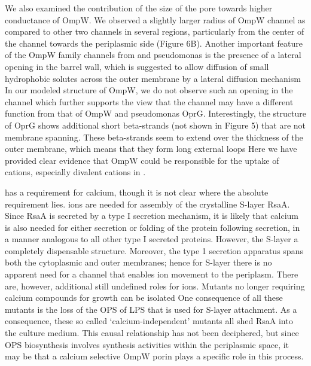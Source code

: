 We also examined the contribution of the size of the pore towards higher conductance of \caulobacter OmpW. We observed a slightly larger radius of \caulobacter OmpW channel as compared to other two channels in several regions, particularly from the center of the channel towards the periplasmic side (Figure 6B). Another important feature of the OmpW family channels from \ecoli and \ac{pseudomonas} is the presence of a lateral opening in the barrel wall, which is suggested to allow diffusion of small hydrophobic solutes across the outer membrane by a lateral diffusion mechanism In our modeled structure of \caulobacter OmpW, we do not observe such an opening in the channel which further supports the view that the \caulobacter channel may have a different function from that of \ecoli OmpW and \ac{pseudomonas} OprG. Interestingly, the structure of OprG shows additional short beta-strands (not shown in Figure 5) that are not membrane spanning. These beta-strands seem to extend over the thickness of the outer membrane, which means that they form long external loops Here we have provided clear evidence that OmpW could be responsible for the uptake of cations, especially divalent cations in \caulobacter. 

\caulobacter has a requirement for calcium, though it is not clear where the absolute requirement lies.  ions are needed for assembly of the crystalline \ac{S-layer} RsaA. Since RsaA is secreted by a type I secretion mechanism, it is likely that calcium is also needed for either secretion or folding of the protein following secretion, in a manner analogous to all other type I secreted proteins.  However, the \ac{S-layer} a completely dispensable structure. Moreover, the type 1 secretion apparatus spans both the cytoplasmic and outer membranes; hence for \ac{S-layer} there is no apparent need for a channel that enables  ion movement to the periplasm. There are, however, additional still undefined roles for  ions. Mutants no longer requiring calcium compounds for growth can be isolated One consequence of all these mutants is the loss of the \ac{OPS} of \ac{LPS} that is used for \ac{S-layer} attachment. As a consequence, these so called `calcium-independent' mutants all shed RsaA into the culture medium. This causal relationship has not been deciphered, but since \ac{OPS} biosynthesis involves synthesis activities within the periplasmic space, it may be that a calcium selective OmpW porin plays a specific role in this process. 


